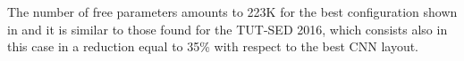 The number of free parameters amounts to 223K for the best configuration shown in  and it is similar to those found for the TUT-SED 2016, which consists also in this case in a reduction equal to 35\% with respect to the best CNN layout.





